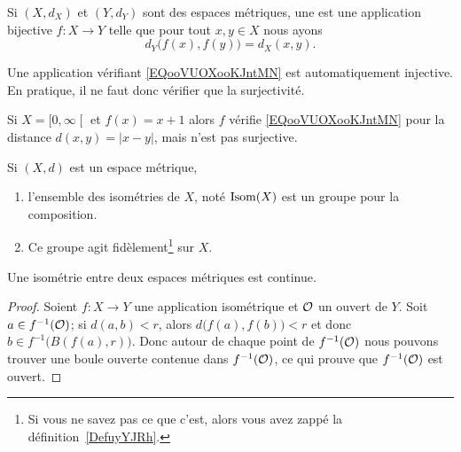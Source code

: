 \begin{definition}
    Si \( (X,d_X)\) et \( (Y,d_Y)\) sont des espaces métriques, une  est une application bijective \( f\colon X\to Y\) telle que pour tout \( x,y\in X\) nous ayons
    \begin{equation}        \label{EQooVUOXooKJntMN}
        d_Y\big( f(x),f(y) \big)=d_X(x,y).
    \end{equation}
\end{definition}

\begin{remark}
    Une application vérifiant \eqref{EQooVUOXooKJntMN} est automatiquement injective. En pratique, il ne faut donc vérifier que la surjectivité.
\end{remark}

\begin{example}
    Si \( X=\mathopen[ 0 , \infty \mathclose[\) et \( f(x)=x+1\) alors \( f\) vérifie \eqref{EQooVUOXooKJntMN} pour la distance \( d(x,y)=| x-y |\), mais n'est pas surjective.
\end{example}

\begin{propositionDef}
    Si \( (X,d)\) est un espace métrique,
    \begin{enumerate}
        \item
            l'ensemble des isométries de \( X\), noté \( \operatorname{Isom}(X)\) est un groupe pour la composition.
        \item
            Ce groupe agit fidèlement\footnote{Si vous ne savez pas ce que c'est, alors vous avez zappé la définition~\ref{DefuyYJRh}.} sur \( X\).
    \end{enumerate}
\end{propositionDef}
\begin{proposition}\label{PropLYMgVMJ}
    Une isométrie entre deux espaces métriques est continue.
\end{proposition}

\begin{proof}
    Soient \( f\colon X\to Y\) une application isométrique et \( \mathcal{O}\) un ouvert de \( Y\). Soit \( a\in f^{-1}(\mathcal{O})\); si \( d(a,b)<r\), alors \( d\big( f(a),f(b) \big)<r\) et donc \( b\in f^{-1}\big( B(f(a),r) \big)\). Donc autour de chaque point de \( f^{-1}(\mathcal{O})\) nous pouvons trouver une boule ouverte contenue dans \( f^{-1}(\mathcal{O})\), ce qui prouve que \( f^{-1}(\mathcal{O})\) est ouvert.
\end{proof}

